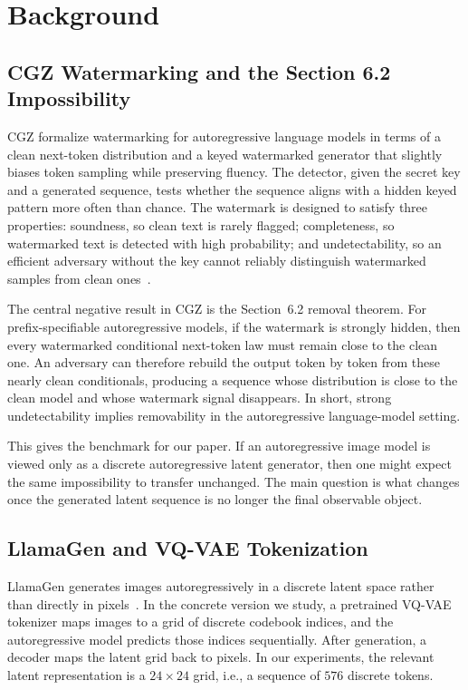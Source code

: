 \documentclass[12pt]{article}
\begin{document}
\section{Background}
\subsection{CGZ Watermarking and the Section 6.2 Impossibility}

CGZ formalize watermarking for autoregressive language models in terms
of a clean next-token distribution and a keyed watermarked generator
that slightly biases token sampling while preserving fluency. The
detector, given the secret key and a generated sequence, tests whether
the sequence aligns with a hidden keyed pattern more often than chance.
The watermark is designed to satisfy three properties: soundness, so
clean text is rarely flagged; completeness, so watermarked text is
detected with high probability; and undetectability, so an efficient
adversary without the key cannot reliably distinguish watermarked
samples from clean ones~\cite{cgz2024}.

The central negative result in CGZ is the Section~6.2 removal theorem.
For prefix-specifiable autoregressive models, if the watermark is
strongly hidden, then every watermarked conditional next-token law must
remain close to the clean one. An adversary can therefore rebuild the
output token by token from these nearly clean conditionals, producing a
sequence whose distribution is close to the clean model and whose
watermark signal disappears. In short, strong undetectability implies
removability in the autoregressive language-model setting.

This gives the benchmark for our paper. If an autoregressive image model
is viewed only as a discrete autoregressive latent generator, then one
might expect the same impossibility to transfer unchanged. The main
question is what changes once the generated latent sequence is no longer
the final observable object.

\subsection{LlamaGen and VQ-VAE Tokenization}

LlamaGen generates images autoregressively in a discrete latent space
rather than directly in pixels~\cite{llamagen2024}. In the concrete
version we study, a pretrained VQ-VAE tokenizer maps images to a grid
of discrete codebook indices, and the autoregressive model predicts
those indices sequentially. After generation, a decoder maps the latent
grid back to pixels. In our experiments, the relevant latent
representation is a $24\times 24$ grid, i.e., a sequence of $576$
discrete tokens.
\end{document}
